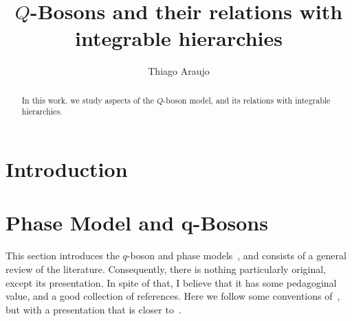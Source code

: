 \documentclass[a4paper,11pt]{amsart}
\begin{document}

\title[\(Q\)-Bosons and relations with integrable hierarchies]{\(Q\)-Bosons
and their relations with integrable hierarchies}

\author{Thiago Araujo}

\address{\noindent 
Instituto de Física Teórica, UNESP-Universidade Estadual Paulista,
R. Dr. Bento T. Ferraz 271, Bl. II, Sao Paulo 01140-070, SP, Brazil\\
\&
Instituto de Física, Universidade de S\~ao Paulo,
Rua do Matão Travessa 1371, 05508-090 São Paulo, SP. Brazil
}


\begin{abstract}
In this work, we study aspects of the \(Q\)-boson model, and 
its relations with integrable hierarchies. 
\end{abstract}

\maketitle

\setcounter{tocdepth}{2}
\tableofcontents

\section{Introduction}


\section{Phase Model and q-Bosons}

This section introduces the \(q\)-boson and phase
models~\cite{Bogoliubov:1992, Bogoliubov:1997soj, Bogoliubov2005,
  Bogoliubov:1997soj, Tsilevich:2006}, and consists of a general
review of the literature. Consequently, there is nothing particularly
original, except its presentation.  In spite of that, I believe that
it has some pedagoginal value, and a good collection of references.
Here we follow some conventions of~\cite{Wheeler:2010vmq}, but with a
presentation that is closer to~\cite{Tsilevich:2006}.
\end{document}
